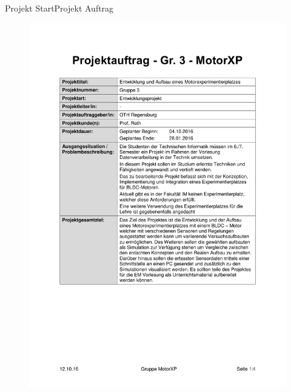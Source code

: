 \begin{frame}{Projekt Start}{Projekt Auftrag}
\begin{figure} [htbp]
 \centering
 \includegraphics[scale=0.3]{../projectdefinition/Appendix/Projektauftrag_Gruppe3_MotorXP.pdf}
\end{figure}
 \end{frame}
